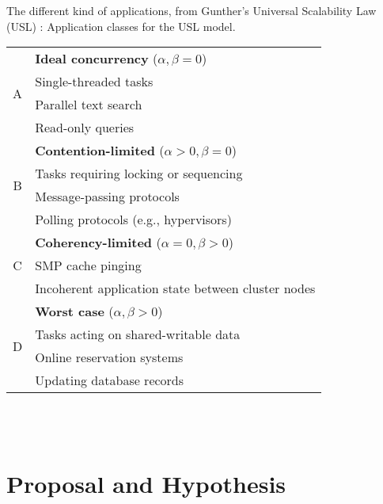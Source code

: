 The different kind of applications, from Gunther's Universal Scalability Law (USL) :
Application classes for the USL model.

\begin{tabular}{c|l} \hline

\multirow{4}{*}{A} & \textbf{Ideal concurrency} ($\alpha, \beta = 0$)      \\
                   & Single-threaded tasks                                 \\
                   & Parallel text search                                  \\
                   & Read-only queries                                     \\ \hline
\multirow{4}{*}{B} & \textbf{Contention-limited} ($\alpha > 0, \beta = 0$) \\
                   & Tasks requiring locking or sequencing                 \\
                   & Message-passing protocols                             \\
                   & Polling protocols (e.g., hypervisors)                 \\ \hline
\multirow{3}{*}{C} & \textbf{Coherency-limited} ($\alpha = 0, \beta > 0$)  \\
                   & SMP cache pinging                                     \\
                   & Incoherent application state between cluster nodes    \\ \hline
\multirow{4}{*}{D} & \textbf{Worst case} ($\alpha, \beta > 0$)             \\
                   & Tasks acting on shared-writable data                  \\
                   & Online reservation systems                            \\
                   & Updating database records                             \\ \hline
\end{tabular}
\\~\\












\section{Proposal and Hypothesis}

